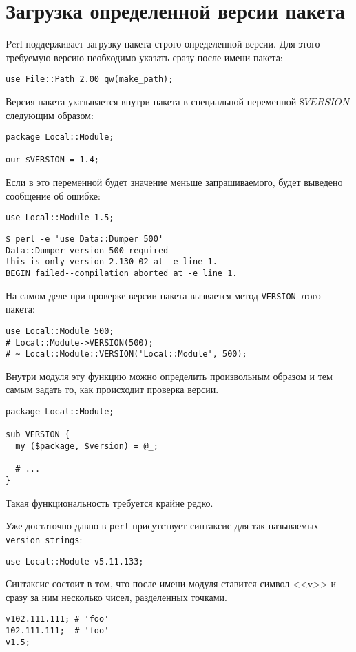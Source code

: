 \section{Загрузка определенной версии пакета}
Perl поддерживает загрузку пакета строго определенной версии. Для этого требуемую версию необходимо указать сразу после имени пакета:
\begin{verbatim}
use File::Path 2.00 qw(make_path);
\end{verbatim}
Версия пакета указывается внутри пакета в специальной переменной $\$VERSION$ следующим образом:
\begin{verbatim}
package Local::Module;

our $VERSION = 1.4;
\end{verbatim}
Если в это переменной будет значение меньше запрашиваемого, будет выведено сообщение об ошибке:
\begin{verbatim}
use Local::Module 1.5;
\end{verbatim}
\begin{verbatim}
$ perl -e 'use Data::Dumper 500'
Data::Dumper version 500 required--
this is only version 2.130_02 at -e line 1.
BEGIN failed--compilation aborted at -e line 1.
\end{verbatim}

На самом деле при проверке версии пакета вызвается метод \verb|VERSION| этого пакета: %
\begin{verbatim}
use Local::Module 500;
# Local::Module->VERSION(500);
# ~ Local::Module::VERSION('Local::Module', 500);
\end{verbatim}
Внутри модуля эту функцию можно определить произвольным образом и тем самым задать то, как происходит проверка версии.
\begin{verbatim}
package Local::Module;

sub VERSION {
  my ($package, $version) = @_;

  # ...
}
\end{verbatim}
Такая функциональность требуется крайне редко.

Уже достаточно давно в \verb|perl| присутствует синтаксис для так называемых \verb|version strings|:
\begin{verbatim}
use Local::Module v5.11.133;
\end{verbatim}
Синтаксис состоит в том, что после имени модуля ставится символ <<v>> и сразу за ним несколько чисел, разделенных точками.
\begin{verbatim}
v102.111.111; # 'foo'
102.111.111;  # 'foo'
v1.5;
\end{verbatim}

